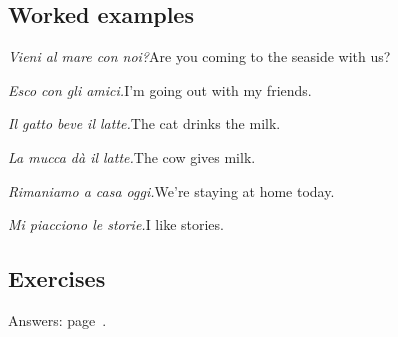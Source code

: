 \documentclass[11pt,a4paper,twoside,openright]{book}
\begin{document}
\subsection*{Worked examples}
\begin{examples}
\item\relax \textit{Vieni al mare con noi?}\newline Are you coming to the seaside with us?
\item\relax \textit{Esco con gli amici.}\newline I'm going out with my friends.
\item\relax \textit{Il gatto beve il latte.}\newline The cat drinks the milk.
\item\relax \textit{La mucca dà il latte.}\newline The cow gives milk.
\item\relax \textit{Rimaniamo a casa oggi.}\newline We're staying at home today.
\item\relax \textit{Mi piacciono le storie.}\newline I like stories.
\end{examples}

\subsection*{Exercises}\label{les:other-irregulars:exercises}
{\color{muted}\small Answers: page~\pageref{ans:other-irregulars}.}
\end{document}

